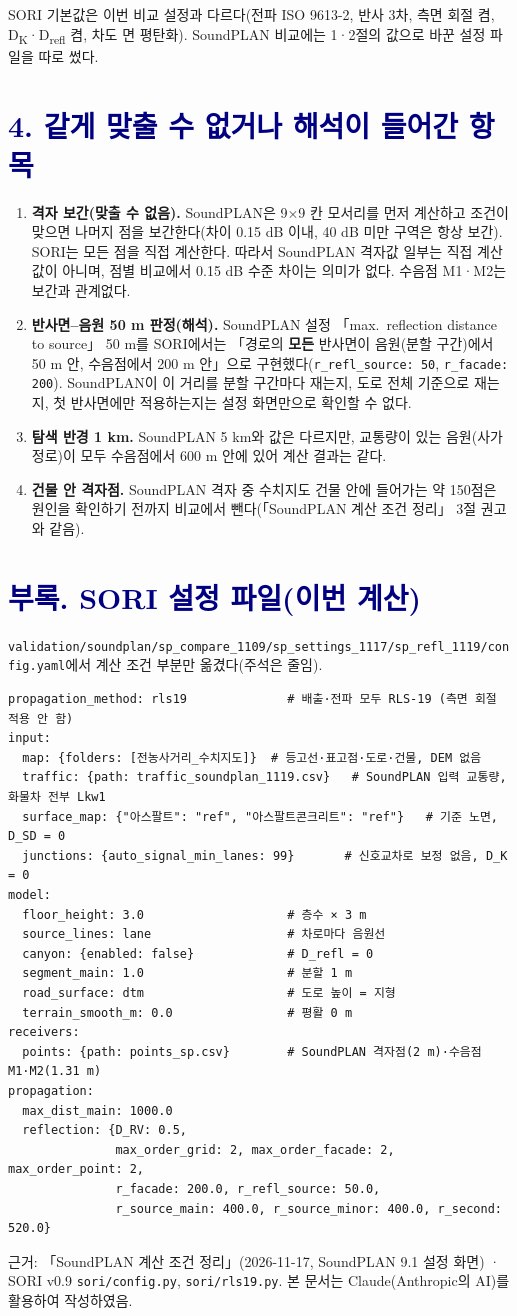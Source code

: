 \documentclass[10pt,a4paper]{article}
\newcommand{\f}[1]{\texttt{\small #1}}
\newcommand{\hl}[1]{\textbf{#1}}
\newcommand{\sect}[1]{\Needspace{6\baselineskip}\section*{\textcolor{navy}{#1}}}
\begin{document}
\vspace{1mm}
{\footnotesize SORI 기본값은 이번 비교 설정과 다르다(전파 ISO 9613-2, 반사 3차, 측면 회절 켬, D\textsubscript{K}·D\textsubscript{refl} 켬, 차도 면 평탄화).
SoundPLAN 비교에는 1·2절의 값으로 바꾼 설정 파일을 따로 썼다.}

\sect{4. 같게 맞출 수 없거나 해석이 들어간 항목}
\begin{enumerate}[leftmargin=1.4em]
\item \hl{격자 보간(맞출 수 없음).} SoundPLAN은 9×9 칸 모서리를 먼저 계산하고 조건이 맞으면 나머지 점을 보간한다(차이 0.15 dB 이내, 40 dB 미만 구역은 항상 보간).
  SORI는 모든 점을 직접 계산한다. 따라서 SoundPLAN 격자값 일부는 직접 계산값이 아니며, 점별 비교에서 0.15 dB 수준 차이는 의미가 없다.
  수음점 M1·M2는 보간과 관계없다.
\item \hl{반사면–음원 50 m 판정(해석).} SoundPLAN 설정 「max.\ reflection distance to source」 50 m를 SORI에서는
  「경로의 \hl{모든} 반사면이 음원(분할 구간)에서 50 m 안, 수음점에서 200 m 안」으로 구현했다(\f{r\_refl\_source: 50}, \f{r\_facade: 200}).
  SoundPLAN이 이 거리를 분할 구간마다 재는지, 도로 전체 기준으로 재는지, 첫 반사면에만 적용하는지는 설정 화면만으로 확인할 수 없다.
\item \hl{탐색 반경 1 km.} SoundPLAN 5 km와 값은 다르지만, 교통량이 있는 음원(사가정로)이 모두 수음점에서 600 m 안에 있어 계산 결과는 같다.
\item \hl{건물 안 격자점.} SoundPLAN 격자 중 수치지도 건물 안에 들어가는 약 150점은 원인을 확인하기 전까지 비교에서 뺀다(「SoundPLAN 계산 조건 정리」 3절 권고와 같음).
\end{enumerate}

\clearpage
\sect{부록. SORI 설정 파일(이번 계산)}
\f{validation/soundplan/sp\_compare\_1109/sp\_settings\_1117/sp\_refl\_1119/config.yaml}에서 계산 조건 부분만 옮겼다(주석은 줄임).
{\footnotesize
\begin{verbatim}
propagation_method: rls19              # 배출·전파 모두 RLS-19 (측면 회절 적용 안 함)
input:
  map: {folders: [전농사거리_수치지도]}  # 등고선·표고점·도로·건물, DEM 없음
  traffic: {path: traffic_soundplan_1119.csv}   # SoundPLAN 입력 교통량, 화물차 전부 Lkw1
  surface_map: {"아스팔트": "ref", "아스팔트콘크리트": "ref"}   # 기준 노면, D_SD = 0
  junctions: {auto_signal_min_lanes: 99}       # 신호교차로 보정 없음, D_K = 0
model:
  floor_height: 3.0                    # 층수 × 3 m
  source_lines: lane                   # 차로마다 음원선
  canyon: {enabled: false}             # D_refl = 0
  segment_main: 1.0                    # 분할 1 m
  road_surface: dtm                    # 도로 높이 = 지형
  terrain_smooth_m: 0.0                # 평활 0 m
receivers:
  points: {path: points_sp.csv}        # SoundPLAN 격자점(2 m)·수음점 M1·M2(1.31 m)
propagation:
  max_dist_main: 1000.0
  reflection: {D_RV: 0.5,
               max_order_grid: 2, max_order_facade: 2, max_order_point: 2,
               r_facade: 200.0, r_refl_source: 50.0,
               r_source_main: 400.0, r_source_minor: 400.0, r_second: 520.0}
\end{verbatim}}

\vfill
{\footnotesize\color{gray} 근거: 「SoundPLAN 계산 조건 정리」(2026-11-17, SoundPLAN 9.1 설정 화면) · SORI v0.9 \f{sori/config.py}, \f{sori/rls19.py}.
본 문서는 Claude(Anthropic의 AI)를 활용하여 작성하였음.}
\end{document}
